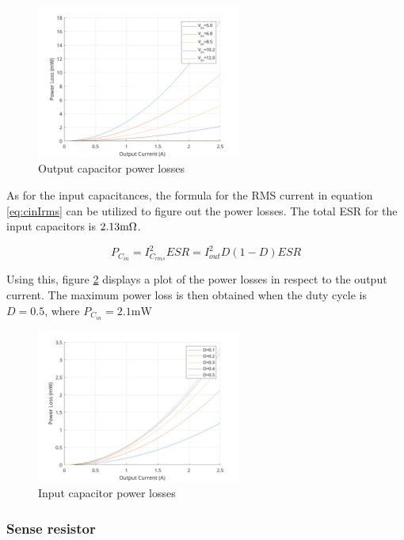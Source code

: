 \documentclass[11pt, a4paper]{article}
\begin{document}
\begin{figure}[H]
    \centering
    \includegraphics[width=0.6\textwidth]{./figures/outputCapLosses.png}
    \caption{Output capacitor power losses}
    \label{fig:coutLosses}
\end{figure}

As for the input capacitances, the formula for the RMS current in equation \ref{eq:cinIrms} can be utilized to figure out the power losses. The total ESR for the input capacitors is $2.13 \text m \Omega$.

\begin{equation}
    P_{C_{in}} = I_{C_{rms}}^2 ESR = I_{out}^2D(1-D)ESR
\end{equation}

Using this, figure \ref{fig:cinLosses} displays a plot of the power losses in respect to the output current. The maximum power loss is then obtained when the duty cycle is $D=0.5$, where $P_{C_{in}}=2.1\text{mW}$

\begin{figure}[H]
    \centering
    \includegraphics[width=0.6\textwidth]{./figures/inputCapLosses.png}
    \caption{Input capacitor power losses}
    \label{fig:cinLosses}
\end{figure}

\subsubsection{Sense resistor}
\end{document}
